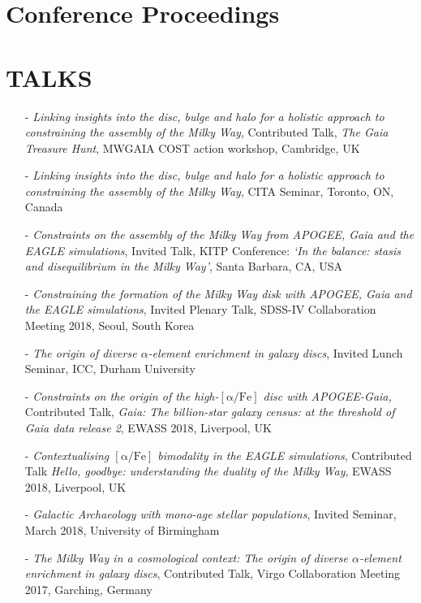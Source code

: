 \documentclass[margin]{res}
\begin{document}
\begin{resume}
\section{Conference Proceedings}
\begin{itemize}

 \end{itemize}
\section{TALKS}
\begin{itemize}
\item[-] \emph{Linking insights into the disc, bulge and halo for a holistic approach to constraining the assembly of the Milky Way}, Contributed Talk, \emph{The Gaia Treasure Hunt}, MWGAIA COST action workshop, Cambridge, UK
\item[-] \emph{Linking insights into the disc, bulge and halo for a holistic approach to constraining the assembly of the Milky Way}, CITA Seminar, Toronto, ON, Canada
\item[-] \emph{Constraints on the assembly of the Milky Way from APOGEE, \emph{Gaia} and the EAGLE simulations}, Invited Talk, KITP Conference: \emph{`In the balance: stasis and disequilibrium in the Milky Way'}, Santa Barbara, CA, USA
\item[-] \emph{Constraining the formation of the Milky Way disk with APOGEE, Gaia and the EAGLE simulations}, Invited Plenary Talk, SDSS-IV Collaboration Meeting 2018, Seoul, South Korea
\item[-]\emph{The origin of diverse $\alpha$-element enrichment in galaxy discs}, Invited Lunch Seminar, ICC, Durham University
\item[-] \emph{Constraints on the origin of the high-$\mathrm{[\alpha/Fe]}$ disc with APOGEE-\emph{Gaia},} Contributed Talk, \emph{Gaia: The billion-star galaxy census: at the threshold of Gaia data release 2}, EWASS 2018, Liverpool, UK 
\item[-] \emph{Contextualising $\mathrm{[\alpha/Fe]}$ bimodality in the EAGLE simulations}, Contributed Talk \emph{Hello, goodbye: understanding the duality of the Milky Way}, EWASS 2018, Liverpool, UK 
\item[-] \emph{Galactic Archaeology with mono-age stellar populations}, Invited Seminar, March 2018, University of Birmingham
\item[-] \emph{The Milky Way in a cosmological context: The origin of diverse $\alpha$-element enrichment in galaxy discs}, Contributed Talk, Virgo Collaboration Meeting 2017, Garching, Germany

\end{itemize}
\end{resume}
\end{document}
